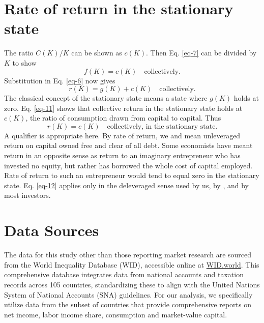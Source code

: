 \section{Rate of return in the stationary state}
The ratio \(C(K)/K\) can be shown as \(c(K)\). Then Eq. \eqref{eq-7} can be divided by \(K\) to show
\begin{equation}
f(K) = c(K) \quad \text{collectively.}\label{eq-10}
\end{equation}
Substitution in Eq. \eqref{eq-6} now gives
\begin{equation}
r(K) = g(K) + c(K) \quad \text{collectively.}\label{eq-11}
\end{equation}
The classical concept of the stationary state means a state where \(g(K)\) holds at zero. Eq. \eqref{eq-11} shows that collective return in the stationary state holds at \(c(K)\), the ratio of consumption drawn from capital to capital. Thus 
\begin{equation}
r(K) = c(K) \quad \text{collectively, in the stationary state.}\label{eq-12}
\end{equation}
A qualifier is appropriate here. By rate of return, we and \citeauthor{jorda2019} mean unleveraged return on capital owned free and clear of all debt. Some economists have meant return in an opposite sense as return to an imaginary entrepreneur who has invested no equity, but rather has borrowed the whole cost of capital employed. Rate of return to such an entrepreneur would tend to equal zero in the stationary state. Eq. \eqref{eq-12} applies only in the deleveraged sense used by us, by \citeauthor{jorda2019}, and by most investors.

\section{Data Sources}

The data for this study other than those reporting market research are sourced from the World Inequality Database (WID), accessible online at \href{https://wid.world}{WID.world}. This comprehensive database integrates data from national accounts and taxation records across 105 countries, standardizing these to align with the United Nations System of National Accounts (SNA) guidelines. For our analysis, we specifically utilize data from the subset of countries that provide comprehensive reports on net income, labor income share, consumption and market-value capital.

